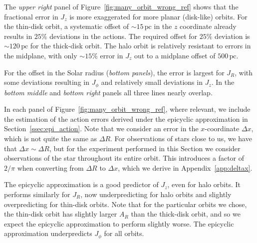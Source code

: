 \documentclass[twocolumn]{aastex62}
\newcommand{\pc}{\text{pc}}
\begin{document}
The {\em upper right} panel of Figure~\ref{fig:many_orbit_wrong_ref} shows
that the fractional error in $J_z$ is more exaggerated for more planar
(disk-like) orbits. For the thin-disk orbit, a systematic offset of
$\sim15\,\pc$ in the $z$ coordinate already results in $25\%$ deviations in
the actions. The required offset for $25\%$ deviation is $\sim120\,\pc$ for
the thick-disk orbit. The halo orbit is relatively resistant to errors in the
midplane, with only $\sim15\%$ error in $J_z$ out to a midplane offset of
$500\,\pc$.

For the offset in the Solar radius ({\em bottom panels}), the error is largest
for $J_R$, with some deviations resulting in $J_{\phi}$ and relatively small
deviations in $J_z$. In the {\em bottom middle} and {\em bottom right} panels
all three lines nearly overlap.

In each panel of Figure~\ref{fig:many_orbit_wrong_ref}, where relevant, we
include the estimation of the action errors derived under the epicyclic
approximation in Section~\ref{ssec:epi_action}. Note that we consider an error
in the $x$-coordinate $\Delta x$, which is not quite the same as $\Delta R$.
For observations of stars close to us, we have that $\Delta x \sim \Delta R$,
but for the experiment performed in this Section we consider observations of
the star throughout its entire orbit. This introduces a factor of $2/\pi$ when
converting from $\Delta R$ to $\Delta x$, which we derive in
Appendix~\ref{app:deltax}.

The epicyclic approximation is a good predictor of $J_z$, even for halo
orbits. It performs similarly for $J_R$, now underpredicting for halo orbits
and slightly overpredicting for thin-disk orbits. Note that for the particular
orbits we chose, the thin-disk orbit has slightly larger $A_R$ than the
thick-disk orbit, and so we expect the epicyclic approximation to perform
slightly worse. The epicyclic approximation underpredicts $J_{\phi}$ for all
orbits.
\end{document}
